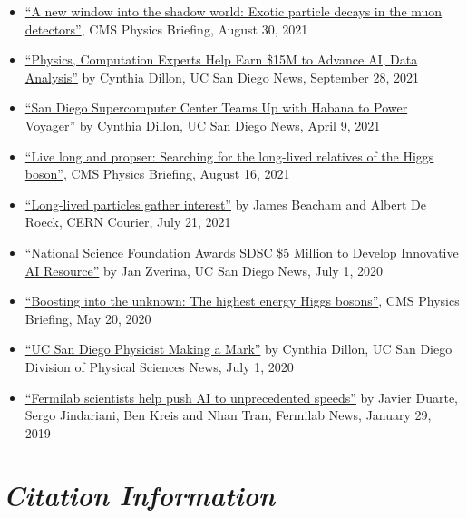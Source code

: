 \documentclass[11pt]{res}
\newcommand{\MarginText}[1]{\section{\textit{#1}}}
\begin{document}
\begin{resume}
\begin{itemize}
    \item \href{https://cms.cern/news/new-window-shadow-world-exotic-particle-decays-muon-detectors}{``A new window into the shadow world: Exotic particle decays in the muon detectors''}, CMS Physics Briefing, August 30, 2021
    \item \href{https://ucsdnews.ucsd.edu/pressrelease/physics-computation-experts-help-earn-15m-to-advance-ai-data-analysis}{``Physics, Computation Experts Help Earn \$15M to Advance AI, Data Analysis''} by Cynthia Dillon, UC San Diego News, September 28, 2021
    \item \href{https://ucsdnews.ucsd.edu/pressrelease/san-diego-supercomputer-center-teams-up-with-habana-to-power-voyager}{``San Diego Supercomputer Center Teams Up with Habana to Power Voyager''} by Cynthia Dillon, UC San Diego News, April 9, 2021
    \item \href{https://cms.cern/news/live-long-and-prosper-searching-long-lived-relatives-higgs-boson}{``Live long and propser: Searching for the long-lived relatives of the Higgs boson''}, CMS Physics Briefing, August 16, 2021
    \item \href{https://cerncourier.com/a/long-lived-particles-gather-interest/}{``Long-lived particles gather interest''} by James Beacham and Albert De Roeck, CERN Courier, July 21, 2021
    \item \href{https://ucsdnews.ucsd.edu/pressrelease/national-science-foundation-awards-sdsc-5-million-to-develop-innovative-ai-resource}{``National Science Foundation Awards SDSC \$5 Million to Develop Innovative AI Resource''} by Jan Zverina, UC San Diego News, July 1, 2020
    \item \href{https://cms.cern/news/boosting-unknown-highest-energy-higgs-bosons}{``Boosting into the unknown: The highest energy Higgs bosons''}, CMS Physics Briefing, May 20, 2020
    \item \href{https://physicalsciences.ucsd.edu/media-events/articles/2020/uc-san-diego-physicist-making-a-mark.html}{``UC San Diego Physicist Making a Mark''} by Cynthia Dillon, UC San Diego Division of Physical Sciences News, July 1, 2020
    \item \href{https://news.fnal.gov/2019/01/fermilab-scientists-help-push-ai-to-unprecedented-speeds/}{``Fermilab scientists help push AI to unprecedented speeds''} by Javier Duarte, Sergo Jindariani, Ben Kreis and Nhan Tran, Fermilab News, January 29, 2019
  \end{itemize}

  \MarginText{Citation Information}


\end{resume}
\end{document}
